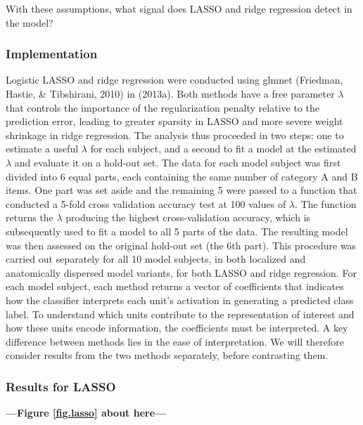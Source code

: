 With these assumptions, what signal does LASSO and ridge regression detect in the model?

\subsubsection{Implementation}
Logistic LASSO and ridge regression were conducted using glmnet (Friedman, Hastie, \& Tibshirani, 2010) in \matlab (2013a). Both methods have a free parameter $\lambda$ that controls the importance of the regularization penalty relative to the prediction error, leading to greater sparsity in LASSO and more severe weight shrinkage in ridge regression. The analysis thus proceeded in two steps: one to estimate a useful $\lambda$ for each subject, and a second to fit a model at the estimated $\lambda$ and evaluate it on a hold-out set. The data for each model subject was first divided into 6 equal parts, each containing the same number of category A and B items. One part was set aside and the remaining 5 were passed to a function that conducted a 5-fold cross validation accuracy test at 100 values of $\lambda$. The function returns the $\lambda$ producing the highest cross-validation accuracy, which is subsequently used to fit a model to all 5 parts of the data. The resulting model was then assessed on the original hold-out set (the 6th part). This procedure was carried out separately for all 10 model subjects, in both localized and anatomically dispersed model variants, for both LASSO and ridge regression. For each model subject, each method returns a vector of coefficients that indicates how the classifier interprets each unit's activation in generating a predicted class label. To understand which units contribute to the representation of interest and how these units encode information, the coefficients must be interpreted. A key difference between methods lies in the ease of interpretation. We will therefore consider results from the two methods separately, before contrasting them.

\subsubsection{Results for LASSO}

\begin{center}
\textbf{---Figure \ref{fig.lasso} about here---}
\end{center}

